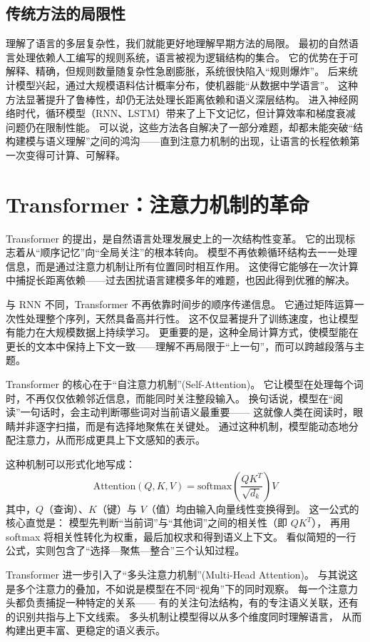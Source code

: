 \subsection{传统方法的局限性}

理解了语言的多层复杂性，我们就能更好地理解早期方法的局限。  
最初的自然语言处理依赖人工编写的规则系统，语言被视为逻辑结构的集合。  
它的优势在于可解释、精确，但规则数量随复杂性急剧膨胀，系统很快陷入“规则爆炸”。  
后来统计模型兴起，通过大规模语料估计概率分布，使机器能“从数据中学语言”。  
这种方法显著提升了鲁棒性，却仍无法处理长距离依赖和语义深层结构。  
进入神经网络时代，循环模型（RNN、LSTM）带来了上下文记忆，但计算效率和梯度衰减问题仍在限制性能。  
可以说，这些方法各自解决了一部分难题，却都未能突破“结构建模与语义理解”之间的鸿沟——直到注意力机制的出现，让语言的长程依赖第一次变得可计算、可解释。  

\section{Transformer：注意力机制的革命}

Transformer 的提出，是自然语言处理发展史上的一次结构性变革。  
它的出现标志着从“顺序记忆”向“全局关注”的根本转向。  
模型不再依赖循环结构去一一处理信息，而是通过注意力机制让所有位置同时相互作用。  
这使得它能够在一次计算中捕捉长距离依赖——过去困扰语言建模多年的难题，也因此得到优雅的解决。  

与 RNN 不同，Transformer 不再依靠时间步的顺序传递信息。  
它通过矩阵运算一次性处理整个序列，天然具备高并行性。  
这不仅显著提升了训练速度，也让模型有能力在大规模数据上持续学习。  
更重要的是，这种全局计算方式，使模型能在更长的文本中保持上下文一致——理解不再局限于“上一句”，而可以跨越段落与主题。  

Transformer 的核心在于“自注意力机制”(Self-Attention)。  
它让模型在处理每个词时，不再仅仅依赖邻近信息，而能同时关注整段输入。  
换句话说，模型在“阅读”一句话时，会主动判断哪些词对当前语义最重要——  
这就像人类在阅读时，眼睛并非逐字扫描，而是有选择地聚焦在关键处。  
通过这种机制，模型能动态地分配注意力，从而形成更具上下文感知的表示。  

这种机制可以形式化地写成：  
\[
\text{Attention}(Q,K,V)=\text{softmax}\left(\frac{QK^T}{\sqrt{d_k}}\right)V
\]  
其中，$Q$（查询）、$K$（键）与 $V$（值）均由输入向量线性变换得到。  
这一公式的核心直觉是：  
模型先判断“当前词”与“其他词”之间的相关性（即 $QK^T$），  
再用 softmax 将相关性转化为权重，最后加权求和得到语义上下文。  
看似简短的一行公式，实则包含了“选择—聚焦—整合”三个认知过程。  

Transformer 进一步引入了“多头注意力机制”(Multi-Head Attention)。  
与其说这是多个注意力的叠加，不如说是模型在不同“视角”下的同时观察。  
每一个注意力头都负责捕捉一种特定的关系——  
有的关注句法结构，有的专注语义关联，还有的识别共指与上下文线索。  
多头机制让模型得以从多个维度同时理解语言，  
从而构建出更丰富、更稳定的语义表示。  

